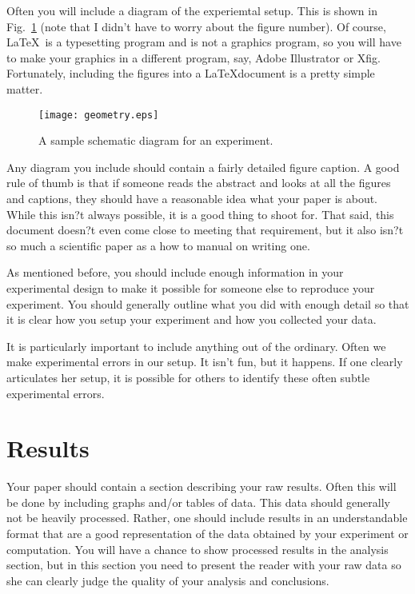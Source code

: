 \documentclass[preprint,pre,floats,aps,amsmath,amssymb]{revtex4}
\begin{document}
Often you will include a diagram of the experiemtal setup.  This is
shown in Fig.~\ref{fig:geometry} (note that I didn't have to worry
about the figure number).  Of course, \LaTeX\ is a typesetting program
and is not a graphics program, so you will have to make your graphics
in a different program, say, Adobe Illustrator or Xfig.  Fortunately,
including the figures into a \LaTeX document is a pretty simple
matter.

\begin{figure}[ht]
\texttt{[image: geometry.eps]}
\caption{A sample schematic diagram for an experiment.}
\label{fig:geometry}
\end{figure}


Any diagram you include should contain a fairly detailed figure
caption.  A good rule of thumb is that if someone reads the abstract
and looks at all the figures and captions, they should have a
reasonable idea what your paper is about.  While this isn?t always
possible, it is a good thing to shoot for.  That said, this document
doesn?t even come close to meeting that requirement, but it also isn?t
so much a scientific paper as a how to manual on writing one.

As mentioned before, you should include enough information in your
experimental design to make it possible for someone else to reproduce
your experiment.  You should generally outline what you did with
enough detail so that it is clear how you setup your experiment and
how you collected your data.  

It is particularly important to include anything out of the ordinary.
Often we make experimental errors in our setup.  It isn't fun, but it
happens.  If one clearly articulates her setup, it is possible for
others to identify these often subtle experimental errors.

\section{Results}
\label{sec:results}

Your paper should contain a section describing your raw results. 
Often this will be done by including graphs and/or tables of data. 
This data should generally not be heavily processed.  Rather, one
should include results in an understandable format that are a good
representation of the data obtained by your experiment or computation.
 You will have a chance to show processed results in the analysis
section, but in this section you need to present the reader with your
raw data so she can clearly judge the quality of your analysis and
conclusions. 
\end{document}
